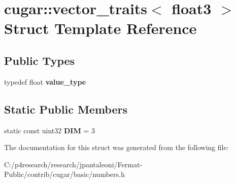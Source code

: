 \hypertarget{structcugar_1_1vector__traits_3_01float3_01_4}{}\section{cugar\+:\+:vector\+\_\+traits$<$ float3 $>$ Struct Template Reference}
\label{structcugar_1_1vector__traits_3_01float3_01_4}
\subsection*{Public Types}
\begin{DoxyCompactItemize}
\item 
\mbox{\label{structcugar_1_1vector__traits_3_01float3_01_4_adf5317925f9b715550324ea61a186a42}} 
typedef float {\bfseries value\+\_\+type}
\end{DoxyCompactItemize}
\subsection*{Static Public Members}
\begin{DoxyCompactItemize}
\item 
\mbox{\label{structcugar_1_1vector__traits_3_01float3_01_4_a203600b026f398889fa151e3bf721ab3}} 
static const uint32 {\bfseries D\+IM} = 3
\end{DoxyCompactItemize}


The documentation for this struct was generated from the following file\+:\begin{DoxyCompactItemize}
\item 
C\+:/p4research/research/jpantaleoni/\+Fermat-\/\+Public/contrib/cugar/basic/numbers.\+h\end{DoxyCompactItemize}
